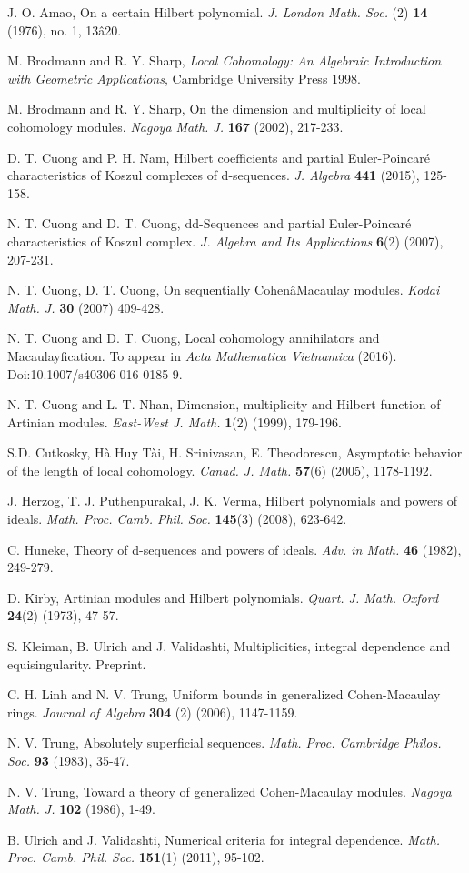 \documentclass{amsart}
\theoremstyle {definition}
\theoremstyle {remark}
\begin{document}
\begin{thebibliography}{99}
J. O. Amao, On a certain Hilbert polynomial. {\it J. London Math. Soc.} (2) {\bf 14} (1976), no. 1, 13â20.

M. Brodmann and R. Y. Sharp, {\it Local Cohomology: An Algebraic Introduction with Geometric Applications}, Cambridge University Press 1998.

M. Brodmann and R. Y. Sharp, On the dimension and multiplicity of local cohomology modules. {\it Nagoya Math. J.} {\bf 167} (2002), 217-233.

D. T. Cuong and P. H. Nam, Hilbert coefficients and partial Euler-Poincar\'e characteristics of Koszul complexes of d-sequences. {\it J. Algebra} {\bf 441} (2015), 125-158.

 N. T. Cuong and D. T. Cuong, dd-Sequences and partial Euler-Poincar\'{e} characteristics of Koszul complex. {\it J. Algebra and Its Applications} {\bf 6}(2) (2007), 207-231.

N. T. Cuong, D. T. Cuong, On sequentially CohenâMacaulay modules. {\it Kodai Math. J.} {\bf 30} (2007) 409-428.

 N. T. Cuong and D. T. Cuong, Local cohomology annihilators and Macaulayfication. To appear in {\it Acta Mathematica Vietnamica} (2016). Doi:10.1007/s40306-016-0185-9.

 N. T. Cuong and L. T. Nhan, Dimension, multiplicity and Hilbert function of Artinian modules. {\it East-West J. Math.} {\bf 1}(2) (1999), 179-196.

 S.D. Cutkosky, H\`a Huy T\`ai, H. Srinivasan, E. Theodorescu, Asymptotic behavior of the length of local cohomology. {\it Canad. J. Math.} {\bf 57}(6) (2005), 1178-1192.

J. Herzog, T. J. Puthenpurakal, J. K. Verma, Hilbert polynomials and powers of ideals. {\it Math. Proc. Camb. Phil. Soc.} {\bf 145}(3) (2008), 623-642.

C. Huneke, Theory of d-sequences and powers of ideals. {\it Adv. in Math.} {\bf 46} (1982), 249-279.

 D. Kirby, Artinian modules and Hilbert polynomials. {\it Quart. J. Math. Oxford} {\bf 24}(2) (1973), 47-57.

 S. Kleiman, B. Ulrich and J. Validashti, Multiplicities, integral dependence and equisingularity. Preprint.

 C. H. Linh and N. V. Trung, Uniform bounds in generalized Cohen-Macaulay rings. {\it Journal of Algebra} {\bf 304} (2) (2006), 1147-1159.

 N. V. Trung, Absolutely superficial sequences. {\it Math. Proc. Cambridge Philos. Soc.} {\bf 93} (1983), 35-47.

N. V. Trung, Toward a theory of generalized Cohen-Macaulay modules. {\it Nagoya Math. J.} {\bf 102} (1986), 1-49.

 B. Ulrich and J. Validashti, Numerical criteria for integral dependence. {\it  Math. Proc. Camb. Phil. Soc.} {\bf 151}(1) (2011), 95-102.
\end{thebibliography}
\end{document}
